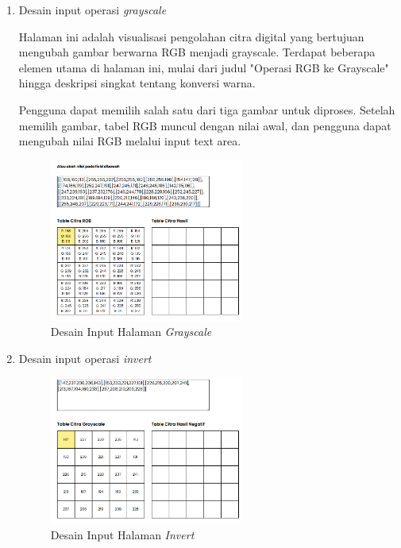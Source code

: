 \begin{enumerate}[leftmargin=1cm, itemindent=0.6cm,labelwidth=15pt, labelsep=5pt, listparindent=1cm,align=left]

    \item Desain input operasi \textit{grayscale}

Halaman ini adalah visualisasi pengolahan citra digital yang bertujuan mengubah gambar berwarna RGB menjadi grayscale. Terdapat beberapa elemen utama di halaman ini, mulai dari judul "Operasi RGB ke Grayscale" hingga deskripsi singkat tentang konversi warna.

Pengguna dapat memilih salah satu dari tiga gambar untuk diproses. Setelah memilih gambar, tabel RGB muncul dengan nilai awal, dan pengguna dapat mengubah nilai RGB melalui input text area.

          \begin{figure}[ht]
    	      \includegraphics[width=0.6\textwidth, center]{images/input-grayscale.png}
              \caption{Desain Input Halaman \textit{Grayscale}}
          \end{figure}

    \item Desain input operasi \textit{invert}

          \begin{figure}[ht]
    	      \includegraphics[width=0.6\textwidth, center]{images/input-invert.png}
              \caption{Desain Input Halaman \textit{Invert}}
          \end{figure}


\end{enumerate}
